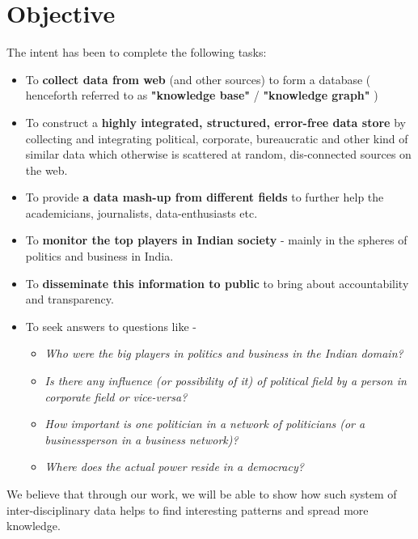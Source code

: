 \section{Objective}

The intent has been to complete the following tasks: 
\begin{itemize}


    \item To \textbf{collect data from web} (and other sources) to form a database ( henceforth referred to as \textbf{"knowledge base"} / \textbf{"knowledge graph"} )
    
    \item To construct a \textbf{highly integrated, structured, error-free data store} by collecting and integrating political, corporate, bureaucratic and other kind of similar data which otherwise is scattered at random, dis-connected sources on the web.

    \item To provide \textbf{a data mash-up from different fields} to further help the academicians, journalists, data-enthusiasts etc.
    
    \item To \textbf{monitor the top players in Indian society} - mainly in the spheres of politics and business in India.
    
    \item To \textbf{disseminate this information to public} to bring about accountability and transparency. 
    
    \item  To seek answers to questions like -
        \begin{itemize}
         \item \emph{ Who were the big players in politics and business in the Indian domain? }
         \item \emph{ Is there any influence (or possibility of it) of political field by a person in corporate field or vice-versa? }
         \item \emph{ How important is one politician in a network of politicians (or a businessperson in a business network)? }
         \item \emph{ Where does the actual power reside in a democracy? }
        \end{itemize}
\end{itemize}
We believe that through our work, we will be able to show how such system of inter-disciplinary data helps to find interesting patterns and spread more knowledge.

